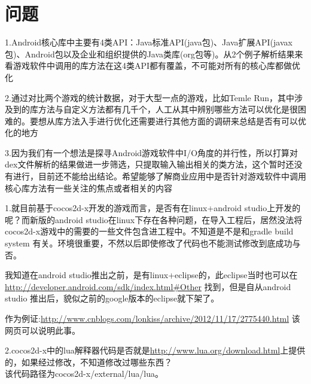 \section{问题}

1.Android核心库中主要有4类API：Java标准API(java包)、Java扩展API(javax包)、Android包以及企业和组织提供的Java类库(org包等)。从2个例子解析结果来看游戏软件中调用的库方法在这4类API都有覆盖，不可能对所有的核心库都做优化

2.通过对比两个游戏的统计数据，对于大型一点的游戏，比如Temle Run，其中涉及到的库方法与自定义方法都有几千个，人工从其中辨别哪些方法可以优化是很困难的。要想从库方法入手进行优化还需要进行其他方面的调研来总结是否有可以优化的地方

3.因为我们有一个想法是探寻Android游戏软件中I/O角度的并行性，所以打算对dex文件解析的结果做进一步筛选，只提取输入输出相关的类方法，这个暂时还没有进行，目前还不能给出结论。希望能够了解商业应用中是否针对游戏软件中调用核心库方法有一些关注的焦点或者相关的内容


1.就目前基于cocos2d-x开发的游戏而言，是否有在linux+android studio上开发的呢？而新版的android studio在linux下存在各种问题，在导入工程后，居然没法将cocos2d-x游戏中的需要的一些文件包含进工程中。不知道是不是和gradle build system 有关。环境很重要，不然以后即使修改了代码也不能测试修改到底成功与否。

我知道在android studio推出之前，是有linux+eclipse的，此eclipse当时也可以在\\
\url{http://developer.android.com/sdk/index.html#Other} 找到，但是自从android studio 推出后，貌似之前的google版本的eclipse就下架了。

作为例证:\url{http://www.cnblogs.com/lonkiss/archive/2012/11/17/2775440.html} 该网页可以说明此事。

2.cocos2d-x中的lua解释器代码是否就是\url{http://www.lua.org/download.html}上提供的，如果经过修改，不知道修改过哪些东西？\\
该代码路径为cocos2d-x/external/lua/lua。

